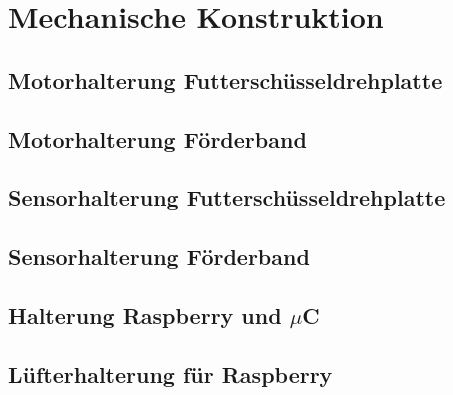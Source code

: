 \section{Mechanische Konstruktion}
\subsection{Motorhalterung Futterschüsseldrehplatte}
\subsection{Motorhalterung Förderband}
\subsection{Sensorhalterung Futterschüsseldrehplatte}
\subsection{Sensorhalterung Förderband}
\subsection{Halterung Raspberry und $\mu$C}
\subsection{Lüfterhalterung für Raspberry}
\newpage
